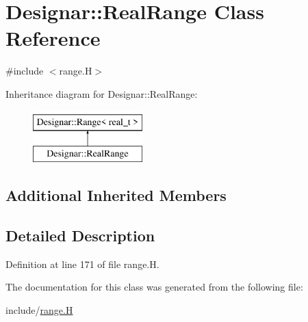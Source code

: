 \hypertarget{class_designar_1_1_real_range}{}\section{Designar\+:\+:Real\+Range Class Reference}
\label{class_designar_1_1_real_range}


{\ttfamily \#include $<$range.\+H$>$}

Inheritance diagram for Designar\+:\+:Real\+Range\+:\begin{figure}[H]
\begin{center}
\leavevmode
\includegraphics[height=2.000000cm]{class_designar_1_1_real_range}
\end{center}
\end{figure}
\subsection*{Additional Inherited Members}


\subsection{Detailed Description}


Definition at line 171 of file range.\+H.



The documentation for this class was generated from the following file\+:\begin{DoxyCompactItemize}
\item 
include/\hyperlink{range_8_h}{range.\+H}\end{DoxyCompactItemize}
